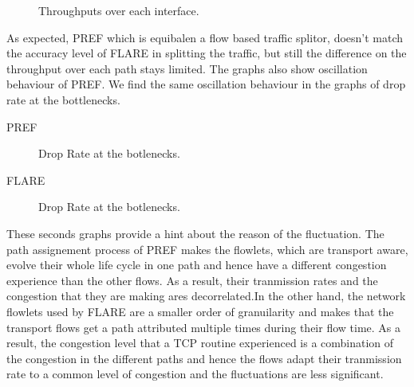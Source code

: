  \begin{figure}[h!]
 \begin{center}
\caption{
  Throughputs over each interface.
    \label{fig:equal-thro-flare}
}
\end{center}

\end{figure}


As expected, PREF which is equibalen a flow based traffic splitor, doesn't match the accuracy level of FLARE in splitting the traffic, but still the difference on the throughput over each path stays limited. The graphs also show oscillation behaviour of PREF. We find the same oscillation behaviour in the graphs of drop rate at the bottlenecks.

PREF

\begin{figure}[h]
 \begin{center}

\caption{
  Drop Rate at the botlenecks.
    \label{fig:equal-thro-pref}
}
\end{center}
\end{figure}

FLARE
 \begin{figure}[h!]
 \begin{center}
\caption{
  Drop Rate at the botlenecks.
    \label{fig:equal-thro-flare}
}
\end{center}
\end{figure}

These seconds graphs provide a hint about the reason of the fluctuation. The path assignement process of PREF makes the flowlets, which are transport aware, evolve their whole life cycle in one path and hence have a different congestion experience than the other flows. As a result, their tranmission rates and the congestion that they are making ares decorrelated.In the other hand, the network flowlets used by FLARE are a smaller order of granuilarity and makes that the transport flows get a path attributed multiple times during their flow time. As a result, the congestion level that a TCP routine experienced is a combination of the congestion in the different paths and hence the flows adapt their tranmission rate to a common level of congestion and the fluctuations are less significant.

